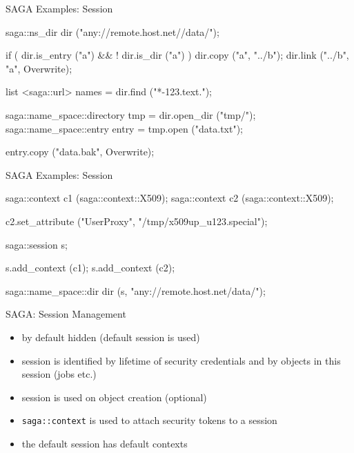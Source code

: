 \documentclass[%
  pdf,
  colorBG,
  slideColor,
  frames,
  ogf
]{prosper}
\newcommand{\T}[1]{\texttt{#1}}
\newcommand{\dn}{\vspace*{+1em}}
\begin{document}

 \begin{slide}{SAGA Examples: Session}

  \begin{mycode}[label=default sessions]

  saga::ns_dir dir ("any://remote.host.net//data/");

  if ( dir.is_entry ("a") && ! dir.is_dir ("a") )
  {
    dir.copy ("a", "../b");
    dir.link ("../b", "a", Overwrite);
  }

  list <saga::url> names = dir.find ("*-{123}.text.");

  saga::name_space::directory  tmp = dir.open_dir ("tmp/");
  saga::name_space::entry    entry = tmp.open     ("data.txt");

  entry.copy ("data.bak", Overwrite);

  \end{mycode}
   
 \end{slide}


 \begin{slide}{SAGA Examples: Session}

  \begin{mycode}[label=context management]

  saga::context c1 (saga::context::X509);
  saga::context c2 (saga::context::X509);

  c2.set_attribute ("UserProxy", "/tmp/x509up_u123.special");

  saga::session s;

  s.add_context (c1);
  s.add_context (c2);

  saga::name_space::dir dir (s, "any://remote.host.net/data/");

  \end{mycode}
   
 \end{slide}


 \begin{slide}{SAGA: Session Management}

 \dn 

  \begin{itemize}
   \item by default hidden (default session is used)
   \item session is identified by lifetime of security credentials and by
   objects in this session (jobs etc.)
   \item session is used on object creation (optional)
   \item \T{saga::context} is used to attach security tokens to a session
   \item the default session has default contexts
  \end{itemize}

 \end{slide}
\end{document}
